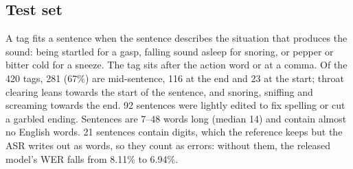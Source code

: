 \documentclass{article} %
\begin{document}
\subsection{Test set}\label{app:test}
A tag fits a sentence when the sentence describes the situation that produces the sound: being
startled for a gasp, falling sound asleep for snoring, or pepper or bitter cold for a sneeze.
The tag sits after the action word or at a comma.
Of the 420 tags, 281 (67\%) are mid-sentence, 116 at the end and 23 at the start; throat
clearing leans towards the start of the sentence, and snoring, sniffing and screaming towards
the end. 92 sentences were lightly edited to fix spelling or cut a garbled ending. Sentences
are 7--48 words long (median 14) and contain almost no English words. 21 sentences contain
digits, which the reference keeps but the ASR writes out as words, so they count as errors:
without them, the released model's WER falls from 8.11\% to 6.94\%.
\end{document}
